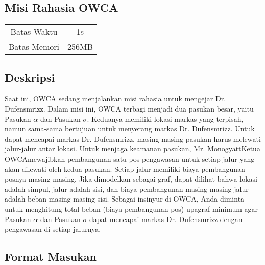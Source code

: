 \documentclass{article}
\begin{document}
\begin{center}

    
    \section*{Misi Rahasia OWCA}

    \begin{tabular}{ | c c | }
        \hline
        Batas Waktu  & 1s \\    %
        Batas Memori & 256MB \\  %
        \hline
    \end{tabular}

    
\end{center}

\subsection*{Deskripsi}

Saat ini, OWCA sedang menjalankan misi rahasia untuk mengejar Dr. Dufensmrizz. Dalam misi ini, OWCA terbagi menjadi dua pasukan besar, yaitu Pasukan \(\alpha\) dan Pasukan \(\sigma\). Keduanya memiliki lokasi markas yang terpisah, namun sama-sama bertujuan untuk menyerang markas Dr. Dufensmrizz.\newline
Untuk dapat mencapai markas Dr. Dufensmrizz, masing-masing pasukan harus melewati jalur-jalur antar lokasi. Untuk menjaga keamanan pasukan, Mr. Monogyatt\textemdash Ketua OWCA\textemdash mewajibkan pembangunan satu pos pengawasan untuk setiap jalur yang akan dilewati oleh kedua pasukan. Setiap jalur memiliki biaya pembangunan posnya masing-masing.\newline
Jika dimodelkan sebagai graf, dapat dilihat bahwa lokasi adalah simpul, jalur adalah sisi, dan biaya pembangunan masing-masing jalur adalah beban masing-masing sisi. Sebagai insinyur di OWCA, Anda diminta untuk menghitung total beban (biaya pembangunan pos) upagraf minimum agar Pasukan \(\alpha\) dan Pasukan \(\sigma\) dapat mencapai markas Dr. Dufensmrizz dengan pengawasan di setiap jalurnya.

\subsection*{Format Masukan}
\end{document}
